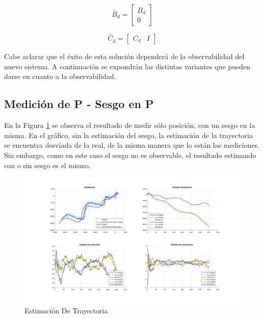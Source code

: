	\begin{equation*}
			\tilde{B_{d}} = \begin{bmatrix} B_{d} \\[0.3em] 0 \end{bmatrix}
	\end{equation*}
	
	\begin{equation*}
			\tilde{C_{d}} = \begin{bmatrix} C_{d} & I \end{bmatrix}
	\end{equation*}
	
	Cabe aclarar que el éxito de esta solución dependerá de la observabilidad del nuevo sistema. A continuación se expondrán las distintas variantes que pueden darse en cuanto a la observabilidad.


\subsection{Medición de P - Sesgo en P}

	En la Figura \ref{fig:ej4a} se observa el resultado de medir sólo posición, con un sesgo en la misma. En el gráfico, sin la estimación del sesgo, la estimación de la trayectoria se encuentra desviada de la real, de la misma manera que lo están las mediciones. Sin embargo, como en este caso el sesgo no es observable, el resultado estimando con o sin sesgo es el mismo.

	\begin{figure}[H]
		\centering
		\includegraphics[scale=0.5,trim={6,5cm 0 0 0}]{Figuras/graf_ej4a.pdf}
		\caption{Estimación De Trayectoria}
		\label{fig:ej4a}
	\end{figure}
	
